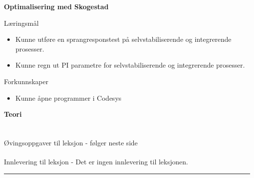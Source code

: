 \centerline{\bf Optimalisering med Skogestad}  \bigskip
	Læringsmål
	\begin{itemize}[noitemsep]
		\item Kunne utføre en sprangresponstest på selvstabiliserende og integrerende prosesser.  
		\item Kunne regn ut PI parametre for selvstabiliserende og integrerende prosesser. 
	\end{itemize}

	Forkunnskaper

	\begin{itemize}[noitemsep]
		\item Kunne åpne programmer i Codesys

	\end{itemize}
\textbf{Teori}\\\\

\\[0.8cm]
Øvingsoppgaver til leksjon - følger neste side\\\\
Innlevering til leksjon - Det er ingen innlevering til leksjonen. 
\bigskip 
\hrule
\vfil \eject
